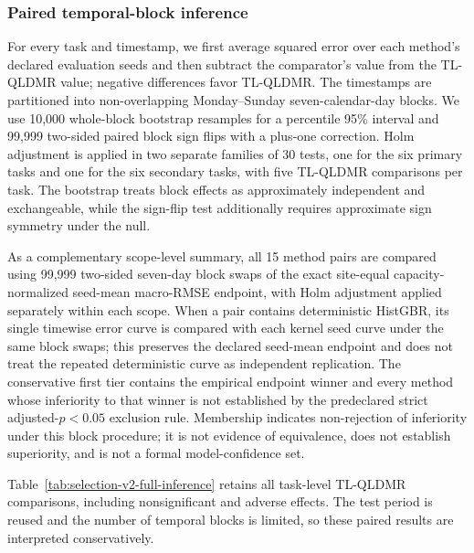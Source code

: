 \subsubsection{Paired temporal-block inference}
{\color{blue}For every task and timestamp, we first average squared error over each method's declared evaluation seeds and then subtract the comparator's value from the TL-QLDMR value; negative differences favor TL-QLDMR. The timestamps are partitioned into non-overlapping Monday--Sunday seven-calendar-day blocks. We use 10,000 whole-block bootstrap resamples for a percentile 95\% interval and 99,999 two-sided paired block sign flips with a plus-one correction. Holm adjustment is applied in two separate families of 30 tests, one for the six primary tasks and one for the six secondary tasks, with five TL-QLDMR comparisons per task. The bootstrap treats block effects as approximately independent and exchangeable, while the sign-flip test additionally requires approximate sign symmetry under the null.}

{\color{blue}As a complementary scope-level summary, all 15 method pairs are compared using 99,999 two-sided seven-day block swaps of the exact site-equal capacity-normalized seed-mean macro-RMSE endpoint, with Holm adjustment applied separately within each scope. When a pair contains deterministic HistGBR, its single timewise error curve is compared with each kernel seed curve under the same block swaps; this preserves the declared seed-mean endpoint and does not treat the repeated deterministic curve as independent replication. The conservative first tier contains the empirical endpoint winner and every method whose inferiority to that winner is not established by the predeclared strict adjusted-$p<0.05$ exclusion rule. Membership indicates non-rejection of inferiority under this block procedure; it is not evidence of equivalence, does not establish superiority, and is not a formal model-confidence set.}



{\color{blue}Table~\ref{tab:selection-v2-full-inference} retains all task-level TL-QLDMR comparisons, including nonsignificant and adverse effects. The test period is reused and the number of temporal blocks is limited, so these paired results are interpreted conservatively.}

